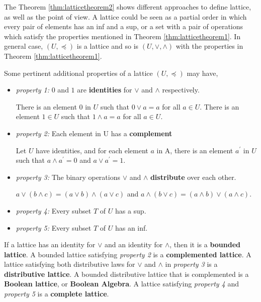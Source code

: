 The Theorem \ref{thm:latticetheorem2} shows different approaches to define lattice, as well as the point of view. A lattice could be seen as a partial order in which every pair of elements has an inf and a sup, or a set with a pair of operations which satisfy the properties mentioned in Theorem \ref{thm:latticetheorem1}. In general case, $(U,\preceq)$ is a lattice and so is $(U,\vee,\wedge)$ with the properties in Theorem \ref{thm:latticetheorem1}.


Some pertinent additional properties of a lattice $(U,\preceq)$ may have,

\begin{itemize}
 
\item \textit{property 1:} $0$ and $1$ are \textbf{identities} for $\vee$ and $\wedge$ respectively.

There is an element $0$ in $U$ such that $0 \vee a = a$ for all $a \in U$. There is an element $1 \in U$ such that $1 \wedge a = a$ for all $a \in U$.

\item \textit{property 2:} Each element in U has a \textbf{complement}

Let $U$ have identities, and for each element $a$ in A, there is an element $a^{'}$ in $U$ such that 
$a \wedge a^{'} = 0$ and $a \vee a^{'} = 1$.

\item \textit{property 3:} The binary operations $\vee$ and $\wedge$ \textbf{distribute} over each other.

$a \vee (b \wedge c) = (a \vee b) \wedge (a \vee c)$ and $a \wedge (b \vee c) = (a \wedge b) \vee (a \wedge c)$.

\item \textit{property 4:} Every subset $T$ of $U$ has a sup.

\item \textit{property 5:} Every subset $T$ of $U$ has an inf.

\end{itemize}
 
If a lattice has an identity for $\vee$ and an identity for $\wedge$, then it is a \textbf{bounded lattice}. A bounded lattice satisfying \textit{property 2} is a \textbf{complemented lattice}.
A lattice satisfying both distributive laws for $\vee$ and $\wedge$ in \textit{property 3} is a \textbf{distributive lattice}. A bounded distributive lattice that is complemented is a \textbf{Boolean lattice}, or \textbf{Boolean Algebra}. A lattice satisfying \textit{property 4} and \textit{property 5} is a \textbf{complete lattice}.

